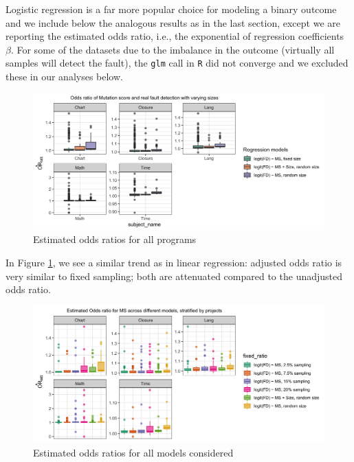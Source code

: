 \documentclass[10pt,letterpaper]{article}
\begin{document}
Logistic regression is a far more popular choice for modeling a binary outcome and we include below the analogous results as in the last section, except we are reporting the estimated odds ratio, i.e., the exponential of regression coefficients $\beta$. For some of the datasets due to the imbalance in the outcome (virtually all samples will detect the fault), the \texttt{glm} call in \texttt{R} did not converge and we excluded these in our analyses below.

\begin{figure}[ht!]
        \centering
        \includegraphics[scale=0.15]{figures/beta_OR_size.png}
        \caption{Estimated odds ratios for all programs}
        \label{fig:beta_OR_size}
    \end{figure}
    
In  Figure \ref{fig:beta_OR_size}, we see a similar trend as in linear regression: adjusted odds ratio is very similar to fixed sampling; both are attenuated compared to the unadjusted odds ratio.

  \begin{figure}[ht!]
        \centering
        \includegraphics[scale=0.15]{figures/stratified_OR_coef_size.png}
        \caption{Estimated odds ratios for all models considered}
        \label{fig:stratified_OR_coef_size}
    \end{figure}
    
\end{document}
